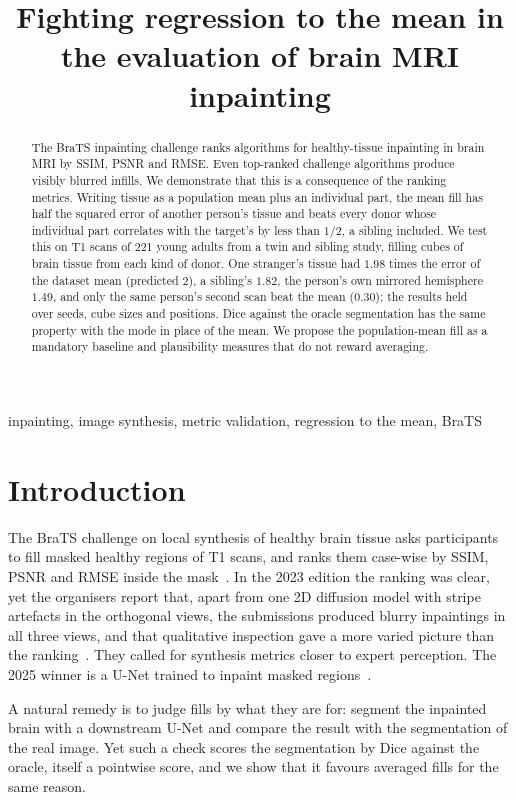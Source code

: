 \documentclass{article}
\title{Fighting regression to the mean in the evaluation of brain MRI inpainting}
\begin{document}
\maketitle

\begin{abstract}
The BraTS inpainting challenge ranks algorithms for healthy-tissue inpainting in brain MRI by SSIM, PSNR and RMSE.
Even top-ranked challenge algorithms produce visibly blurred infills.
We demonstrate that this is a consequence of the ranking metrics.
Writing tissue as a population mean plus an individual part, the mean fill has half the squared error of another person's tissue and beats every donor whose individual part correlates with the target's by less than $1/2$, a sibling included.
We test this on T1 scans of 221 young adults from a twin and sibling study, filling cubes of brain tissue from each kind of donor.
One stranger's tissue had $1.98$ times the error of the dataset mean (predicted $2$), a sibling's $1.82$, the person's own mirrored hemisphere $1.49$, and only the same person's second scan beat the mean ($0.30$); the results held over seeds, cube sizes and positions.
Dice against the oracle segmentation has the same property with the mode in place of the mean.
We propose the population-mean fill as a mandatory baseline and plausibility measures that do not reward averaging.
\end{abstract}
\begin{keywords}
inpainting, image synthesis, metric validation, regression to the mean, BraTS
\end{keywords}

\section{Introduction}
\label{sec:intro}
The BraTS challenge on local synthesis of healthy brain tissue asks participants to fill masked healthy regions of T1 scans, and ranks them case-wise by SSIM, PSNR and RMSE inside the mask~\cite{kofler2023brats,inpainting2026}.
In the 2023 edition the ranking was clear, yet the organisers report that, apart from one 2D diffusion model with stripe artefacts in the orthogonal views, the submissions produced blurry inpaintings in all three views, and that qualitative inspection gave a more varied picture than the ranking~\cite{kofler2023brats}.
They called for synthesis metrics closer to expert perception.
The 2025 winner is a U-Net trained to inpaint masked regions~\cite{zhang2025brats}.

A natural remedy is to judge fills by what they are for: segment the inpainted brain with a downstream U-Net and compare the result with the segmentation of the real image.
Yet such a check scores the segmentation by Dice against the oracle, itself a pointwise score, and we show that it favours averaged fills for the same reason.
\end{document}
